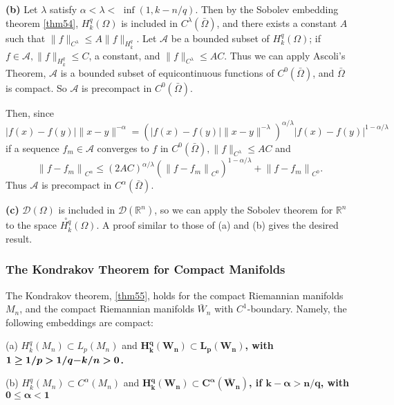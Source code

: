 \documentclass[12pt,hyperref,a4paper,UTF8]{ctexart}
\begin{document}
\begin{Proof}
\vskip 10pt
\textbf{(b)} Let $\lambda$ satisfy $\alpha<\lambda<$ $\inf (1, k-n / q)$. Then by the Sobolev embedding theorem \autoref{thm54}, $H_k^q(\Omega)$ is included in $C^\lambda(\bar{\Omega})$, and there exists a constant $A$ such that $\|f\|_{C^\lambda} \leq A\|f\|_{H_k^q}$.
Let $\mathcal{A}$ be a bounded subset of $H_k^q(\Omega)$; if $f \in \mathcal{A},\|f\|_{H_k^q} \leq C$, a constant, and $\|f\|_{C^\lambda} \leq A C$.
Thus we can apply Ascoli's Theorem, $\mathcal{A}$ is a bounded subset of equicontinuous functions of $C^0(\bar{\Omega})$, and $\bar{\Omega}$ is compact. So $\mathcal{A}$ is precompact in $C^0(\bar{\Omega})$.

\noindent
Then, since
$$
|f(x)-f(y)|\|x-y\|^{-\alpha}=\left(|f(x)-f(y)|\|x-y\|^{-\lambda}\right)^{\alpha / \lambda}|f(x)-f(y)|^{1-\alpha / \lambda}
$$
if a sequence $f_m \in \mathcal{A}$ converges to $f$ in $C^0(\bar{\Omega}),\|f\|_{C^\lambda} \leq A C$ and
$$
\left\|f-f_m\right\|_{C^\alpha} \leq(2 A C)^{\alpha / \lambda}\left(\left\|f-f_m\right\|_{C^0}\right)^{1-\alpha / \lambda}+\left\|f-f_m\right\|_{C^0} .
$$
Thus $\mathcal{A}$ is precompact in $C^\alpha(\bar{\Omega})$.

\vskip 10pt
\textbf{(c)} $\mathcal{D}(\Omega)$ is included in $\mathcal{D}\left(\mathbb{R}^n\right)$, so we can apply the Sobolev theorem for $\mathbb{R}^n$ to the space $\stackrel{\circ}{H_k^q}(\Omega)$. A proof similar to those of (a) and (b) gives the desired result.
\end{Proof}

\subsubsection{The Kondrakov Theorem for Compact Manifolds}

\begin{Theorem}
The Kondrakov theorem, \autoref{thm55}, holds for the compact Riemannian manifolds ${M_n}$, and the compact Riemannian manifolds ${\bar{W}_n}$ with ${C^1}$-boundary. Namely, the following embeddings are compact:

\vskip 5pt
\noindent
(a) ${H_k^q\left(M_n\right) \subset L_p\left(M_n\right)}$ and \textbf{$\bm{H_k^q\left(W_n\right) \subset L_p\left(W_n\right)}$, with $\bm{1 \geq 1 / p>1 / q-$ $k / n>0}$.}

\vskip 5pt
\noindent
(b) ${H_k^q\left(M_n\right) \subset C^\alpha\left(M_n\right)}$ and \textbf{$\bm{H_k^q\left(W_n\right) \subset C^\alpha\left(\bar{W}_n\right)}$, if $\bm{k-\alpha>n / q}$, with $\bm{0 \leq \alpha<1}$}
\end{Theorem}
\end{document}
